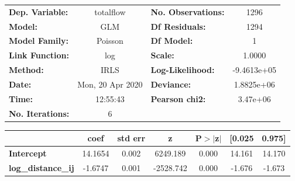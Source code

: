 \begin{center}
\begin{tabular}{lclc}
\toprule
\textbf{Dep. Variable:}    &    totalflow     & \textbf{  No. Observations:  } &      1296    \\
\textbf{Model:}            &       GLM        & \textbf{  Df Residuals:      } &      1294    \\
\textbf{Model Family:}     &     Poisson      & \textbf{  Df Model:          } &         1    \\
\textbf{Link Function:}    &       log        & \textbf{  Scale:             } &     1.0000   \\
\textbf{Method:}           &       IRLS       & \textbf{  Log-Likelihood:    } & -9.4613e+05  \\
\textbf{Date:}             & Mon, 20 Apr 2020 & \textbf{  Deviance:          } &  1.8825e+06  \\
\textbf{Time:}             &     12:55:43     & \textbf{  Pearson chi2:      } &   3.47e+06   \\
\textbf{No. Iterations:}   &        6         & \textbf{                     } &              \\
\bottomrule
\end{tabular}
\begin{tabular}{lcccccc}
                           & \textbf{coef} & \textbf{std err} & \textbf{z} & \textbf{P$> |$z$|$} & \textbf{[0.025} & \textbf{0.975]}  \\
\midrule
\textbf{Intercept}         &      14.1654  &        0.002     &  6249.189  &         0.000        &       14.161    &       14.170     \\
\textbf{log\_distance\_ij} &      -1.6747  &        0.001     & -2528.742  &         0.000        &       -1.676    &       -1.673     \\
\bottomrule
\end{tabular}
\end{center}